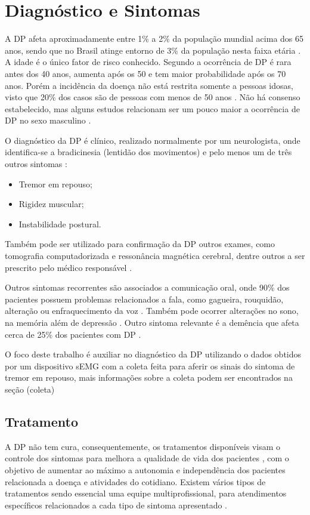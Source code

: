 \section{Diagnóstico e Sintomas}
A DP afeta aproximadamente entre 1\% a 2\% da população mundial acima dos 65 anos, sendo que no Brasil atinge entorno de 3\% da população nesta faixa etária \cite{magalhaes2009descobrindo}. A idade é o único fator de risco conhecido. Segundo  a ocorrência de DP é rara antes dos 40 anos, aumenta após os 50 e tem maior probabilidade após os 70 anos. Porém a incidência da doença não está restrita somente a pessoas idosas, visto que 20\% dos casos são de pessoas com menos de 50 anos \cite{gago2014manual}. Não há consenso estabelecido, mas alguns estudos relacionam ser um pouco maior a ocorrência de DP no sexo masculino \cite{peixinho2006alteraccoes}.

O diagnóstico da DP é clínico, realizado normalmente por um neurologista, onde identifica-se a bradicinesia (lentidão dos movimentos) e pelo menos um de três outros sintomas \cite{gago2014manual}:
\begin{itemize}
	\item Tremor em repouso;
	\item Rigidez muscular;
	\item Instabilidade postural.
\end{itemize}

Também pode ser utilizado para confirmação da DP outros exames, como tomografia computadorizada e ressonância magnética cerebral, dentre outros a ser prescrito pelo médico responsável \cite{gago2014manual}.

Outros sintomas recorrentes são associados a comunicação oral, onde 90\% dos pacientes possuem problemas relacionados a fala, como gagueira, rouquidão, alteração ou enfraquecimento da voz \cite{zarzur2010laryngeal}. Também pode ocorrer alterações no sono, na memória além de depressão \cite{barbosa2005parkinsons}. Outro sintoma relevante é a demência que afeta cerca de 25\% dos pacientes com DP \cite{pamplona1996demencia}.

O foco deste trabalho é auxiliar no diagnóstico da DP utilizando o dados obtidos por um dispositivo sEMG com a coleta feita para aferir os sinais do sintoma de tremor em repouso, mais informações sobre a coleta podem ser encontrados na seção (coleta)

\subsection{Tratamento}
A DP não tem cura, consequentemente, os tratamentos disponíveis visam o controle dos sintomas para melhora a qualidade de vida dos pacientes \cite{pamplona1996demencia}, com o objetivo de aumentar ao máximo a autonomia e independência dos pacientes relacionada a doença e atividades do cotidiano. Existem vários tipos de tratamentos sendo essencial uma equipe multiprofissional, para atendimentos específicos relacionados a cada tipo de sintoma apresentado \cite{saito2011doencca}.